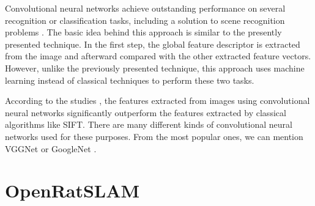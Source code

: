 Convolutional neural networks achieve outstanding performance on several recognition or classification tasks, including a solution to scene recognition problems \parencite{CNNSceneRecognition1} \parencite{CNNSceneRecognition2}. The basic idea behind this approach is similar to the presently presented technique. In the first step, the global feature descriptor is extracted from the image and afterward compared with the other extracted feature vectors. However, unlike the previously presented technique, this approach uses machine learning instead of classical techniques to perform these two tasks.\par
According to the studies \cite{fischer2014descriptor}\cite{Imagenet}, the features extracted from images using convolutional neural networks significantly outperform the features extracted by classical algorithms like SIFT. There are many different kinds of convolutional neural networks used for these purposes. From the most popular ones, we can mention VGGNet \parencite{VggNet} or GoogleNet \parencite{GoogleNet}.

\section{OpenRatSLAM}\label{section:ratSlamRW}
